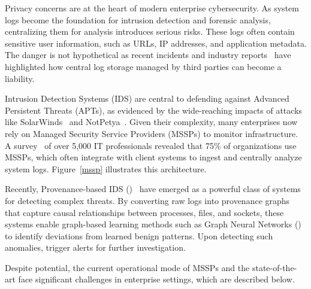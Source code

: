 




Privacy concerns are at the heart of modern enterprise cybersecurity. As system logs become the foundation for intrusion detection and forensic analysis, centralizing them for analysis introduces serious risks. These logs often contain sensitive user information, such as URLs, IP addresses, and application metadata. The danger is not hypothetical as recent incidents and industry reports~\cite{datadog} have highlighted how central log storage managed by third parties can become a liability.

Intrusion Detection Systems (IDS) are central to defending against Advanced Persistent Threats (APTs), as evidenced by the wide-reaching impacts of attacks like SolarWinds~\cite{solarwinds} and NotPetya~\cite{notpetya}. Given their complexity, many enterprises now rely on Managed Security Service Providers (MSSPs) to monitor infrastructure. A survey~\cite{msspsurvey} of over 5,000 IT professionals revealed that 75\% of organizations use MSSPs, which often integrate with client systems to ingest and centrally analyze system logs. Figure~\ref{mssp} illustrates this architecture.

Recently, Provenance-based IDS (\pids)~\cite{streamspot,provdetector2020,wang2022threatrace,shadewatcher,yangprographer,han2020unicorn,jia2023magic,flash2024,cheng2023kairos,sigl} have emerged as a powerful class of systems for detecting complex threats. By converting raw logs into provenance graphs that capture causal relationships between processes, files, and sockets, these systems enable graph-based learning methods such as Graph Neural Networks (\gnnshort) to identify deviations from learned benign patterns. Upon detecting such anomalies, \pids trigger alerts for further investigation.

\smallskip
{}
\smallskip

\noindent
Despite \pids potential, the current operational mode of MSSPs and the state-of-the-art \pids face significant challenges in enterprise settings, which are described below.

